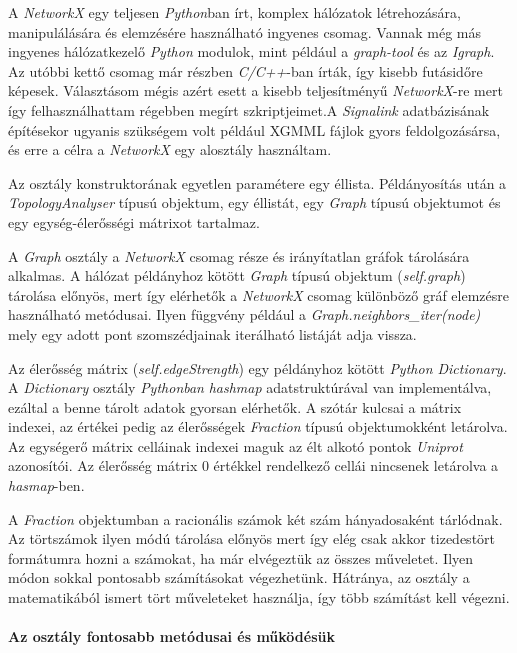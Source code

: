 \documentclass[a4paper,12pt]{article}
\begin{document}
		A \textit{NetworkX} egy teljesen \textit{Python}ban írt, komplex hálózatok létrehozására, manipulálására és elemzésére használható ingyenes csomag. Vannak még más ingyenes hálózatkezelő \textit{Python} modulok, mint például a \textit{graph-tool} és az \textit{Igraph}. Az utóbbi kettő csomag már részben \textit{C/C++}-ban írták, így kisebb futásidőre képesek. Választásom mégis azért esett a kisebb teljesítményű \textit{NetworkX}-re mert így felhasználhattam régebben megírt szkriptjeimet.A \textit{Signalink} adatbázisának építésekor ugyanis szükségem volt például XGMML fájlok gyors feldolgozásársa, és erre a célra a \textit{NetworkX} egy alosztály használtam.

		Az osztály konstruktorának egyetlen paramétere egy éllista. Példányosítás után a \textit{TopologyAnalyser} típusú objektum, egy éllistát, egy \textit{Graph} típusú objektumot és egy egység-élerősségi mátrixot tartalmaz.

		A \textit{Graph} osztály a \textit{NetworkX} csomag része és irányítatlan gráfok tárolására alkalmas. A hálózat példányhoz kötött \textit{Graph} típusú objektum (\textit{self.graph}) tárolása előnyös, mert így elérhetők a \textit{NetworkX} csomag különböző gráf elemzésre használható metódusai. Ilyen függvény például a \textit{Graph.neighbors\_iter(node)} mely egy adott pont szomszédjainak iterálható listáját adja vissza.

		Az élerősség mátrix (\textit{self.edgeStrength}) egy példányhoz kötött \textit{Python Dictionary}. A \textit{Dictionary} osztály   \textit{Pythonban} \textit{hashmap} adatstruktúrával van implementálva, ezáltal a benne tárolt adatok gyorsan elérhetők. A szótár kulcsai a mátrix indexei, az értékei pedig az élerősségek \textit{Fraction} típusú objektumokként letárolva. Az egységerő mátrix celláinak indexei maguk az élt alkotó pontok \textit{Uniprot} azonosítói. Az élerősség mátrix 0 értékkel rendelkező cellái nincsenek letárolva a \textit{hasmap}-ben.

		 A \textit{Fraction} objektumban a racionális számok két szám hányadosaként tárlódnak. Az törtszámok ilyen módú tárolása előnyös mert így elég csak akkor tizedestört formátumra hozni a számokat, ha már elvégeztük az összes műveletet. Ilyen módon sokkal pontosabb számításokat végezhetünk. Hátránya, az osztály a matematikából ismert tört műveleteket használja, így több számítást kell végezni.

		\paragraph{Az osztály fontosabb metódusai és működésük}
\end{document}
